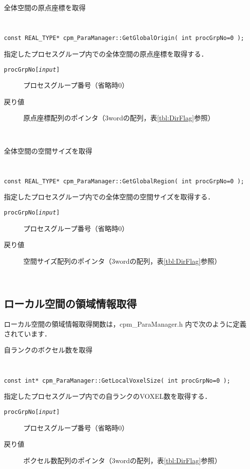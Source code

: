 \begin{spacing}{0.8}
\begin{itembox}[l]{全体空間の原点座標を取得}
{\tt
\begin{verbatim}
const REAL_TYPE* cpm_ParaManager::GetGlobalOrigin( int procGrpNo=0 );
\end{verbatim}
}
指定したプロセスグループ内での全体空間の原点座標を取得する．
\begin{description}
\item[{\tt procGrpNo[{\it input}]}] プロセスグループ番号（省略時0）
\\
\item[戻り値]原点座標配列のポインタ（3wordの配列，表\ref{tbl:DirFlag}参照）
\end{description}
\end{itembox}\\
\end{spacing}

\begin{spacing}{0.8}
\begin{itembox}[l]{全体空間の空間サイズを取得}
{\tt
\begin{verbatim}
const REAL_TYPE* cpm_ParaManager::GetGlobalRegion( int procGrpNo=0 );
\end{verbatim}
}
指定したプロセスグループ内での全体空間の空間サイズを取得する．
\begin{description}
\item[{\tt procGrpNo[{\it input}]}] プロセスグループ番号（省略時0）
\\
\item[戻り値]空間サイズ配列のポインタ（3wordの配列，表\ref{tbl:DirFlag}参照）
\end{description}
\end{itembox}\\
\end{spacing}


\clearpage


\subsection{ローカル空間の領域情報取得}
\label{localInfo}
ローカル空間の領域情報取得関数は，cpm\_ParaManager.h 内で次のように定義されています．\\

\begin{spacing}{0.8}
\begin{itembox}[l]{自ランクのボクセル数を取得}
{\tt
\begin{verbatim}
const int* cpm_ParaManager::GetLocalVoxelSize( int procGrpNo=0 );
\end{verbatim}
}
指定したプロセスグループ内での自ランクのVOXEL数を取得する．
\begin{description}
\item[{\tt procGrpNo[{\it input}]}] プロセスグループ番号（省略時0）
\\
\item[戻り値]ボクセル数配列のポインタ（3wordの配列，表\ref{tbl:DirFlag}参照）
\end{description}
\end{itembox}\\
\end{spacing}


